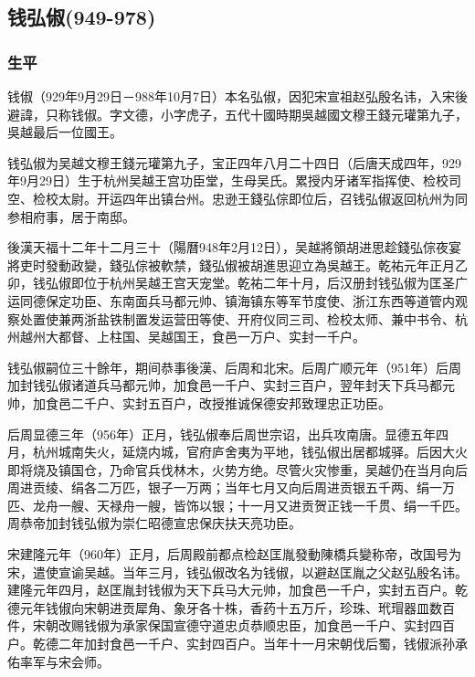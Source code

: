 
\subsection{钱弘俶\tiny(949-978)}

\subsubsection{生平}

钱俶（929年9月29日－988年10月7日）本名弘俶，因犯宋宣祖赵弘殷名讳，入宋後避諱，只称钱俶。字文德，小字虎子，五代十國時期吳越國文穆王錢元瓘第九子，吳越最后一位國王。

钱弘俶为吴越文穆王錢元瓘第九子，宝正四年八月二十四日（后唐天成四年，929年9月29日）生于杭州吴越王宫功臣堂，生母吴氏。累授内牙诸军指挥使、检校司空、检校太尉。开运四年出镇台州。忠逊王錢弘倧即位后，召钱弘俶返回杭州为同参相府事，居于南邸。

後漢天福十二年十二月三十（陽曆948年2月12日），吴越將領胡进思趁錢弘倧夜宴將吏时發動政變，錢弘倧被軟禁，錢弘俶被胡進思迎立為吳越王。乾祐元年正月乙卯，钱弘俶即位于杭州吴越王宫天宠堂。乾祐二年十月，后汉册封钱弘俶为匡圣广运同德保定功臣、东南面兵马都元帅、镇海镇东等军节度使、浙江东西等道管内观察处置使兼两浙盐铁制置发运营田等使、开府仪同三司、检校太师、兼中书令、杭州越州大都督、上柱国、吴越国王，食邑一万户、实封一千户。

钱弘俶嗣位三十餘年，期间恭事後漢、后周和北宋。后周广顺元年（951年）后周加封钱弘俶诸道兵马都元帅，加食邑一千户、实封三百户，翌年封天下兵马都元帅，加食邑二千户、实封五百户，改授推诚保德安邦致理忠正功臣。

后周显德三年（956年）正月，钱弘俶奉后周世宗诏，出兵攻南唐。显德五年四月，杭州城南失火，延烧内城，官府庐舍夷为平地，钱弘俶出居都城驿。后因大火即将烧及镇国仓，乃命官兵伐林木，火势方绝。尽管火灾惨重，吴越仍在当月向后周进贡绫、绢各二万匹，银子一万两；当年七月又向后周进贡银五千两、绢一万匹、龙舟一艘、天禄舟一艘，皆饰以银；十一月又进贡贺正钱一千贯、绢一千匹。周恭帝加封钱弘俶为崇仁昭德宣忠保庆扶天亮功臣。

宋建隆元年（960年）正月，后周殿前都点检赵匡胤發動陳橋兵變称帝，改国号为宋，遣使宣谕吴越。当年三月，钱弘俶改名为钱俶，以避赵匡胤之父赵弘殷名讳。建隆元年四月，赵匡胤封钱俶为天下兵马大元帅，加食邑一千户，实封五百户。乾德元年钱俶向宋朝进贡犀角、象牙各十株，香药十五万斤，珍珠、玳瑁器皿数百件，宋朝改赐钱俶为承家保国宣德守道忠贞恭顺忠臣，加食邑一千户、实封四百户。乾德二年加封食邑一千户、实封四百户。当年十一月宋朝伐后蜀，钱俶派孙承佑率军与宋会师。

